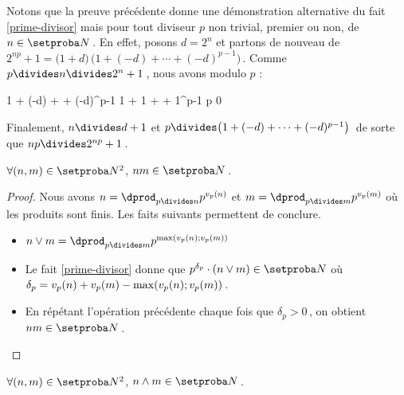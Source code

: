 Notons que la preuve précédente donne une démonstration alternative du fait \ref{prime-divisor} mais pour tout diviseur $p$ non trivial, premier ou non, de $n \in \ourset$\,.
En effet,
posons $d = 2^n$ et partons de nouveau de $2^{np} + 1 = \big( 1 + d \big) \, \big( 1 + (-d) + \cdots + (-d)^{p-1}  \big)$\,.
Comme $p \divides n \divides 2^n + 1$\,, nous avons modulo $p$ :

\medskip

\begin{stepcalc}[style = ar*, ope = \equiv]
	1 + (-d) + \cdots + (-d)^{p-1} 
	1 + 1 + \cdots + 1^{p-1} 
\explnext{}
	p
\explnext{}
	0
\end{stepcalc}

\medskip 

Finalement,
$n \divides d + 1$ et $p \divides \big( 1 + (-d) + \cdots + (-d)^{p-1}  \big)$\, de sorte que $n p \divides 2^{n p} + 1$\,.




\begin{fact} \label{product}
	$\forall (n , m) \in \ourset^2$, $n m \in \ourset$\,.
\end{fact}

\begin{proof}
	Nous avons
	$n = \dprod_{p \divides n} p^{\padicval{n}}$
	et
	$m = \dprod_{p \divides m} p^{\padicval{m}}$
	où les produits sont finis.
	Les faits suivants permettent de conclure.

	\begin{itemize}
		\item $n \vee m = \dprod_{p \divides m} p^{\max ( \padicval{n} ; \padicval{m} )}$

		\item Le fait \ref{prime-divisor} donne que $p^{\delta_p} \cdot ( n \vee m ) \in \ourset$ où $\delta_p = \padicval{n} + \padicval{m} - \max ( \padicval{n} ; \padicval{m} )$\,.

		\item En répétant l'opération précédente chaque fois que $\delta_p > 0$\,, on obtient $n m \in \ourset$\,.
	\end{itemize}
\end{proof}




\begin{fact} \label{gcd}
	$\forall (n , m) \in \ourset^2$, $n \wedge m \in \ourset$\,.
\end{fact}

